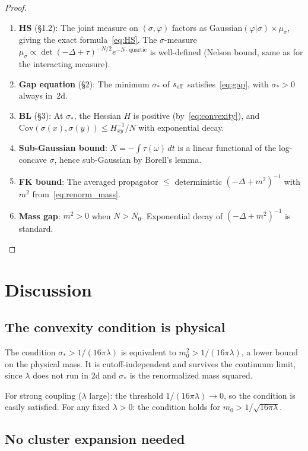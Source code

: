 \documentclass[12pt]{article}
\theoremstyle{definition}
\theoremstyle{remark}
\newcommand{\Cov}{\mathrm{Cov}}
\newcommand{\ph}{\varphi}
\begin{document}
\begin{proof}
\begin{enumerate}
\item \textbf{HS} (\S1.2): The joint measure on $(\sigma,\ph)$
  factors as Gaussian$(\ph|\sigma) \times \mu_\sigma$, giving the
  exact formula~\eqref{eq:HS}. The $\sigma$-measure
  $\mu_\sigma \propto \det(-\Delta+\tau)^{-N/2} e^{-N\cdot\text{quartic}}$
  is well-defined (Nelson bound, same as for the interacting measure).
\item \textbf{Gap equation} (\S2): The minimum $\sigma_*$ of
  $s_{\rm eff}$ satisfies~\eqref{eq:gap}, with $\sigma_* > 0$ always
  in~2d.
\item \textbf{BL} (\S3): At $\sigma_*$, the Hessian $H$ is positive
  (by~\eqref{eq:convexity}), and $\Cov(\sigma(x),\sigma(y)) \le
  H^{-1}_{xy}/N$ with exponential decay.
\item \textbf{Sub-Gaussian bound}: $X = -\int\tau(\omega)\,dt$ is a
  linear functional of the log-concave $\sigma$, hence sub-Gaussian
  by Borell's lemma.
\item \textbf{FK bound}: The averaged propagator $\le$
  deterministic $(-\Delta+m^2)^{-1}$ with $m^2$ from~\eqref{eq:renorm_mass}.
\item \textbf{Mass gap}: $m^2 > 0$ when $N > N_0$. Exponential
  decay of $(-\Delta+m^2)^{-1}$ is standard. \qedhere
\end{enumerate}
\end{proof}

\section{Discussion}

\subsection{The convexity condition is physical}

The condition $\sigma_* > 1/(16\pi\lambda)$ is equivalent to
$m_0^2 > 1/(16\pi\lambda)$, a lower bound on the physical mass.
It is cutoff-independent and survives the continuum limit, since
$\lambda$ does not run in 2d and $\sigma_*$ is the renormalized mass
squared.

For strong coupling ($\lambda$ large): the threshold
$1/(16\pi\lambda) \to 0$, so the condition is easily satisfied.
For any fixed $\lambda > 0$: the condition holds for
$m_0 > 1/\sqrt{16\pi\lambda}$.

\subsection{No cluster expansion needed}
\end{document}
